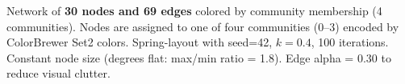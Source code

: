 \caption{Network of \textbf{30 nodes and 69 edges} colored by community membership (4 communities). Nodes are assigned to one of four communities (0--3) encoded by ColorBrewer Set2 colors. Spring-layout with seed=42, $k=0.4$, 100 iterations. Constant node size (degrees flat: max/min ratio = 1.8). Edge alpha = 0.30 to reduce visual clutter.}

